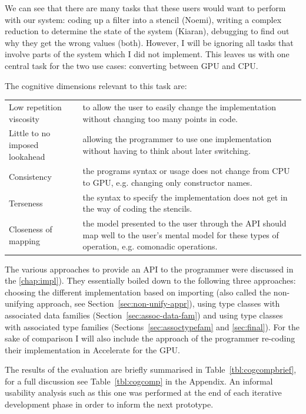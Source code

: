 \documentclass[
    12pt,
    a4paper,
    twoside,
    openright,
    ]{scrbook}
\begin{document}
We can see that there are many tasks that these users would want to
perform with our system: coding up a filter into a stencil (Noemi),
writing a complex reduction to determine the state of the system
(Kiaran), debugging to find out why they get the wrong values (both).
However, I will be ignoring all tasks that involve parts of the system
which I did not implement. This leaves us with one central task for the
two use cases: converting between GPU and CPU.

The cognitive dimensions relevant to this task are:

\begin{tabular}{p{} p{}}
  Low repetition viscosity & to allow the user to easily change the
  implementation without changing too many points in code.
  \\
  Little to no imposed lookahead & allowing the programmer to use one
  implementation without having to think about later switching.
  \\
  Consistency & the programs syntax or usage does not change from CPU to
  GPU, e.g. changing only constructor names.
  \\
  Terseness & the syntax to specify the implementation does not get in the
  way of coding the stencils.
  \\
  Closeness of mapping & the model presented to the user through the API should
  map well to the user's mental model for these types of
  operation, e.g. comonadic operations.
  \\
\end{tabular}

The various approaches to provide an API to the programmer were discussed in the
\autoref{chap:impl}). They essentially boiled down to the following three
approaches: choosing the different implementation based on importing (also
called the non-unifying approach, see Section~\ref{sec:non-unify-appr}), using
type classes with associated data families (Section~\ref{sec:assoc-data-fam})
and using type classes with associated type families
(Sections~\ref{sec:assoctypefam} and \ref{sec:final}). For the sake of
comparison I will also include the approach of the programmer re-coding their
implementation in Accelerate for the GPU.

The results of the evaluation are briefly summarised in
Table~\ref{tbl:cogcompbrief}, for a full discussion see Table~\ref{tbl:cogcomp}
in the Appendix. An informal usability analysis such as this one was performed
at the end of each iterative development phase in order to inform the next
prototype.
\end{document}

